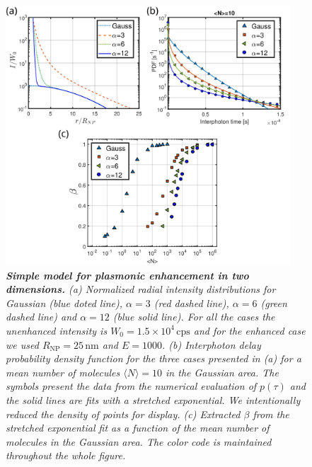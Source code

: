 \begin{figure}
\includegraphics[width=0.95\textwidth]{04_Figure_4_enhancement_model_beta}%
\caption{\textit{\textbf{Simple model for plasmonic enhancement in two dimensions.} 
(a) Normalized radial intensity distributions for Gaussian (blue doted line), $\alpha=3$ (red dashed line),
$\alpha=6$ (green dashed line) and $\alpha=12$ (blue solid line). For all the cases the 
unenhanced intensity is $W_0=1.5\times10^4\,\mbox{cps}$ and for the enhanced case we used
$R_\textrm{NP}=25 \,\mbox{nm}$ and $E=1000$.
(b) Interphoton delay probability density function for the three cases presented in (a)
for a mean number of molecules $\langle N \rangle =10$ in the Gaussian area. The symbols present
the data from the numerical evaluation of $p(\tau)$ and the solid lines are fits with a stretched exponential. 
We intentionally reduced the density of points for display.
(c) Extracted $\beta$ from the stretched exponential fit as a function of the mean number of 
molecules in the Gaussian area. The color code is maintained throughout the whole figure. 
\label{fg:enahncement_model}}}
\end{figure}


